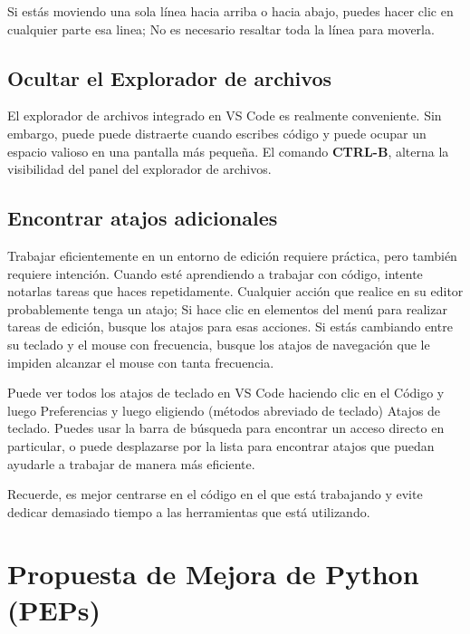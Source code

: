 Si estás moviendo una sola línea hacia arriba o hacia abajo, puedes hacer clic en cualquier parte
esa linea; No es necesario resaltar toda la línea para moverla.

\subsection{Ocultar el Explorador de archivos}

El explorador de archivos integrado en VS Code es realmente conveniente. Sin embargo, puede
puede distraerte cuando escribes código y puede ocupar un espacio valioso en
una pantalla más pequeña. El comando {\bf\scriptsize CTRL-B}, alterna la visibilidad del panel del explorador de archivos.


\subsection{Encontrar atajos adicionales}

Trabajar eficientemente en un entorno de edición requiere práctica, pero también
requiere intención. Cuando esté aprendiendo a trabajar con código, intente notarlas tareas 
que haces repetidamente. Cualquier acción que realice en su editor probablemente tenga un
atajo; Si hace clic en elementos del menú para realizar tareas de edición, busque
los atajos para esas acciones. Si estás cambiando entre su teclado
y el mouse con frecuencia, busque los atajos de navegación que le impiden
alcanzar el mouse con tanta frecuencia.

Puede ver todos los atajos de teclado en VS Code haciendo clic en el Código y
luego Preferencias y luego eligiendo (métodos abreviado de teclado) Atajos de teclado. Puedes usar la
barra de búsqueda para encontrar un acceso directo en particular, o puede desplazarse por la lista para
encontrar atajos que puedan ayudarle a trabajar de manera más eficiente.

Recuerde, es mejor centrarse en el código en el que está trabajando y evite dedicar demasiado tiempo a las herramientas que está utilizando.








\section{Propuesta de Mejora de Python (PEPs)}\label{pep8}

